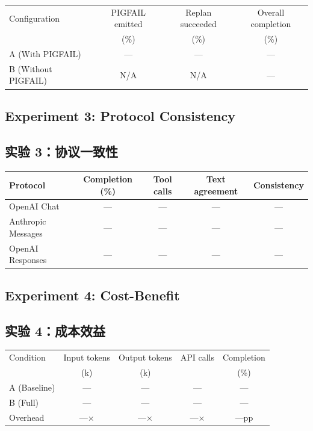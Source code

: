 \begin{center}
\begin{tabular}{lccc}
\toprule
Configuration & PIGFAIL emitted & Replan succeeded & Overall completion \\
 & (\%) & (\%) & (\%) \\
\midrule
A (With PIGFAIL) & --- & --- & --- \\
B (Without PIGFAIL) & N/A & N/A & --- \\
\bottomrule
\end{tabular}
\end{center}

\subsection{Experiment 3: Protocol Consistency}
\begin{chinese}
\subsection*{实验 3：协议一致性}
\end{chinese}

\begin{center}
\begin{tabular}{lcccc}
\toprule
Protocol & Completion (\%) & Tool calls & Text agreement & Consistency \\
\midrule
OpenAI Chat & --- & --- & --- & --- \\
Anthropic Messages & --- & --- & --- & --- \\
OpenAI Responses & --- & --- & --- & --- \\
\bottomrule
\end{tabular}
\end{center}

\subsection{Experiment 4: Cost-Benefit}
\begin{chinese}
\subsection*{实验 4：成本效益}
\end{chinese}

\begin{center}
\begin{tabular}{lcccc}
\toprule
Condition & Input tokens & Output tokens & API calls & Completion \\
 & (k) & (k) & & (\%) \\
\midrule
A (Baseline) & --- & --- & --- & --- \\
B (Full) & --- & --- & --- & --- \\
Overhead & ---$\times$ & ---$\times$ & ---$\times$ & ---pp \\
\bottomrule
\end{tabular}
\end{center}
